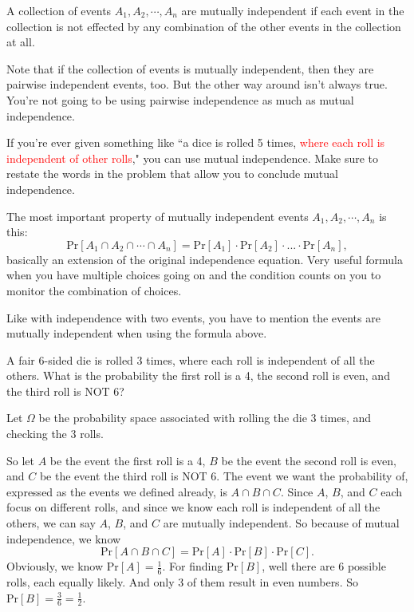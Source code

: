 \documentclass[11pt]{scrartcl}
\begin{document}
\begin{definition}
    A collection of events $A_1, A_2, \cdots, A_n$ are mutually independent if each event in the collection is not effected by any combination of the other events in the collection at all.
\end{definition}

Note that if the collection of events is mutually independent, then they are pairwise independent events, too. But the other way around isn't always true. You're not going to be using pairwise independence as much as mutual independence.

\begin{advice}
If you're ever given something like ``a dice is rolled 5 times, \textcolor{red}{where each roll is independent of other rolls}," you can use mutual independence. Make sure to restate the words in the problem that allow you to conclude mutual independence.
\end{advice}

The most important property of mutually independent events $A_1, A_2, \cdots, A_n$ is this: \[\text{Pr}[A_1 \cap A_2 \cap \cdots \cap A_n] = \text{Pr}[A_1] \cdot \text{Pr}[A_2] \cdot ... \cdot \text{Pr}[A_n],\] basically an extension of the original independence equation. Very useful formula when you have multiple choices going on and the condition counts on you to monitor the combination of choices.

\begin{caveat}
Like with independence with two events, you have to mention the events are mutually independent when using the formula above.
\end{caveat}

\begin{example}
A fair 6-sided die is rolled 3 times, where each roll is independent of all the others. What is the probability the first roll is a 4, the second roll is even, and the third roll is NOT 6?
\end{example}

Let $\Omega$ be the probability space associated with rolling the die 3 times, and checking the 3 rolls.

So let $A$ be the event the first roll is a 4, $B$ be the event the second roll is even, and $C$ be the event the third roll is NOT 6. The event we want the probability of, expressed as the events we defined already, is $A \cap B \cap C$. Since $A$, $B$, and $C$ each focus on different rolls, and since we know each roll is independent of all the others, we can say $A$, $B$, and $C$ are mutually independent. So because of mutual independence, we know \[\text{Pr}[A \cap B \cap C] = \text{Pr}[A] \cdot \text{Pr}[B] \cdot \text{Pr}[C].\] Obviously, we know $\text{Pr}[A] = \frac{1}{6}$. For finding $\text{Pr}[B]$, well there are 6 possible rolls, each equally likely. And only 3 of them result in even numbers. So $\text{Pr}[B] = \frac{3}{6} = \frac{1}{2}$.
\end{document}
